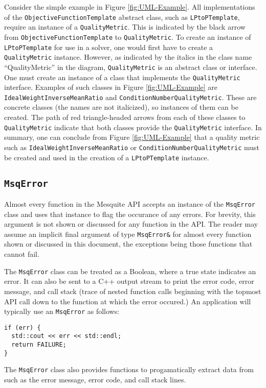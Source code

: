 \documentclass{article}
\begin{document}
Consider the simple example in Figure \ref{fig:UML-Example}.  All implementations of the \texttt{ObjectiveFunctionTemplate} abstract class, such as \texttt{LPtoPTemplate}, require an instance of a \texttt{QualityMetric}.  This is indicated by the black arrow from \texttt{ObjectiveFunctionTemplate} to \texttt{QualityMetric}.  To create an instance of \texttt{LPtoPTemplate} for use in a solver, one would first have to create a \texttt{QualityMetric} instance.  However, as indicated by the italics in the class name ``QualityMetric'' in the diagram, \texttt{QualityMetric} is an abstract class or interface.  One must create an instance of a class that implements the \texttt{QualityMetric} interface.  Examples of such classes in Figure \ref{fig:UML-Example} are \texttt{IdealWeightInverseMeanRatio} and \texttt{ConditionNumberQualityMetric}.  These are concrete classes (the names are not italicized), so instances of them can be created.  The path of red triangle-headed arrows from each of these classes to \texttt{QualityMetric} indicate that both classes provide the \texttt{QualityMetric} interface.  In summary, one can conclude from Figure \ref{fig:UML-Example} that a quality metric such as   \texttt{IdealWeightInverseMeanRatio} or \texttt{ConditionNumberQualityMetric} must be created and used in the creation of a \texttt{LPtoPTemplate} instance.


\subsection{\texttt{MsqError}}

Almost every function in the Mesquite API accepts an instance of the \texttt{MsqError} class and uses that instance to flag the occurance of any errors.  For brevity, this argument is not shown or discussed for any function in the API.  The reader may assume an implicit final argument of type \texttt{MsqError\&} for almost every function shown or discussed in this document, the exceptions being those functions that cannot fail.

The \texttt{MsqError} class can be treated as a Boolean, where a true state indicates an error.  It can also be sent to a C++ output stream to print the error code, error message, and call stack (trace of nested function calls beginning with the topmost API call down to the function at which the error occured.)  An application will typically use an \texttt{MsqError} as follows:
\begin{lstlisting}
if (err) {
  std::cout << err << std::endl;
  return FAILURE;
}
\end{lstlisting}
The \texttt{MsqError} class also provides functions to progamatically extract data from such as the error message, error code, and call stack lines.
\end{document}

